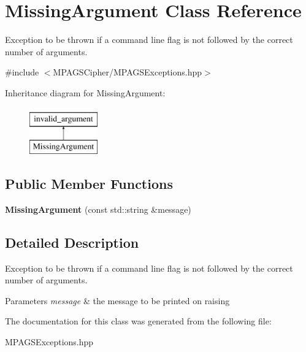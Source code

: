 \hypertarget{class_missing_argument}{}\section{Missing\+Argument Class Reference}
\label{class_missing_argument}


Exception to be thrown if a command line flag is not followed by the correct number of arguments.  




{\ttfamily \#include $<$M\+P\+A\+G\+S\+Cipher/\+M\+P\+A\+G\+S\+Exceptions.\+hpp$>$}

Inheritance diagram for Missing\+Argument\+:\begin{figure}[H]
\begin{center}
\leavevmode
\includegraphics[height=2.000000cm]{class_missing_argument}
\end{center}
\end{figure}
\subsection*{Public Member Functions}
\begin{DoxyCompactItemize}
\item 
{\bfseries Missing\+Argument} (const std\+::string \&message)\hypertarget{class_missing_argument_a84ca3a1ba823eb806d1694b5f1fdb633}{}\label{class_missing_argument_a84ca3a1ba823eb806d1694b5f1fdb633}

\end{DoxyCompactItemize}


\subsection{Detailed Description}
Exception to be thrown if a command line flag is not followed by the correct number of arguments. 


\begin{DoxyParams}{Parameters}
{\em message} & the message to be printed on raising \\
\hline
\end{DoxyParams}


The documentation for this class was generated from the following file\+:\begin{DoxyCompactItemize}
\item 
M\+P\+A\+G\+S\+Exceptions.\+hpp\end{DoxyCompactItemize}
